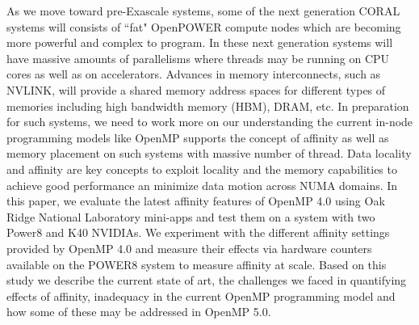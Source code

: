 As we move toward pre-Exascale systems, some of the next generation CORAL systems will consists of ``fat" OpenPOWER compute nodes  
which are  becoming more powerful and complex to program. In these next generation systems will have massive amounts of parallelisms 
where threads may be running on CPU cores as well as on accelerators. Advances in memory interconnects, such as NVLINK, will provide a 
shared memory address spaces for different types of memories including high bandwidth memory (HBM), DRAM, etc. 
In preparation for such systems, we need to work more on our understanding the current in-node programming models like OpenMP supports
the concept of affinity as well as memory placement on such systems with massive number of thread. Data locality and affinity are key
concepts to exploit locality and the memory capabilities to achieve good performance an minimize data motion across NUMA domains. In this 
paper, we evaluate the latest affinity features of OpenMP 4.0 using Oak Ridge National Laboratory mini-apps 
and test them on a system with two Power8 and K40 NVIDIAs. We experiment with the different affinity settings provided by OpenMP 4.0 and 
measure their effects via hardware counters available on the POWER8 system to measure affinity at scale. Based on this study we describe 
the current state of art, the challenges we faced in quantifying effects of affinity, inadequacy in the current OpenMP programming model and 
how some of these may be addressed in OpenMP 5.0.